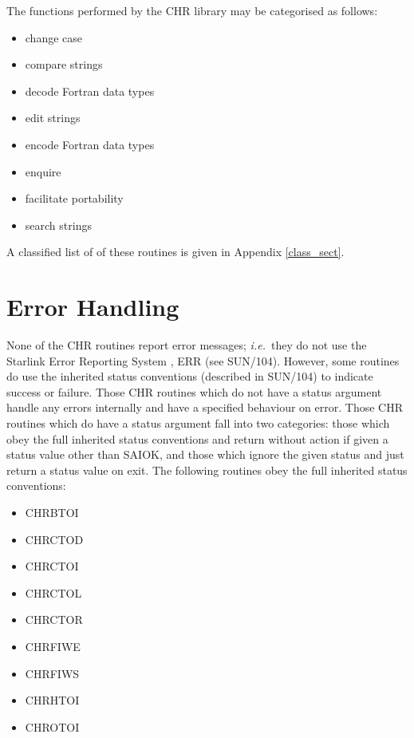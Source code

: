 \documentclass[twoside,11pt]{article}
\newcommand{\latex}[1]{#1}
\newcommand{\xref}[3]{#1}
\renewcommand{\_}{\texttt{\symbol{95}}}
\begin{document}
The functions performed by the CHR library may be categorised as follows:

\begin{itemize}
\item change case
\item compare strings
\item decode Fortran data types 
\item edit strings
\item encode Fortran data types 
\item enquire
\item facilitate portability
\item search strings
\end{itemize}

A classified list of of these routines is given in Appendix \ref{class_sect}.


\section {Error Handling \label{err_sect} }

None of the CHR routines report error messages; {\em i.e.}\ they do not use 
\xref{the Starlink Error Reporting System}{sun104}{}
\latex{, ERR (see SUN/104)}.
However, some routines do use the 
\xref{inherited status conventions}{sun104}{inherited_status}
\latex{(described in SUN/104) }to indicate success or failure.
Those CHR routines which do not have a status argument handle any errors
internally and have a specified behaviour on error.
Those CHR routines which do have a status argument fall into two categories:
those which obey the full inherited status conventions and return without 
action if given a status value other than SAI\_\_OK, and those which ignore 
the given status and just return a status value on exit.
The following routines obey the full inherited status conventions:

\begin {itemize}
\item CHR\_BTOI
\item CHR\_CTOD
\item CHR\_CTOI
\item CHR\_CTOL
\item CHR\_CTOR
\item CHR\_FIWE
\item CHR\_FIWS
\item CHR\_HTOI
\item CHR\_OTOI
\end {itemize}
\end{document}
